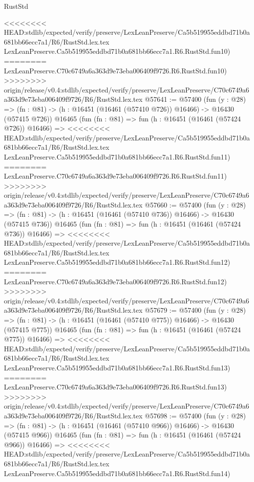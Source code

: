 \begin{lexlean}{RustStd}
\begin{coremodule}
{\begin{coremodule}
{{{{{{{{{{{{{{{{{{{{{{{{{{{{{{{{{{{{{{{{{{{{{{{{{{{{{{{<<<<<<<< HEAD:stdlib/expected/verify/preserve/LexLeanPreserve/Ca5b519955eddbd71b0a681bb66ecc7a1/R6/RustStd.lex.tex
    LexLeanPreserve.Ca5b519955eddbd71b0a681bb66ecc7a1.R6.RustStd.fun10)
========
    LexLeanPreserve.C70c6749a6a363d9e73eba006409f9726.R6.RustStd.fun10)
>>>>>>>> origin/release/v0.4:stdlib/expected/verify/preserve/LexLeanPreserve/C70c6749a6a363d9e73eba006409f9726/R6/RustStd.lex.tex
@57641 := @57400
    (fun (y : @28) =>
    (fn : @81) -> (h : @16451 (@16461 (@57410 @726)) @16466) -> @16430 (@57415 @726))
    @16465
    (fun (fn : @81) =>
    fun (h : @16451 (@16461 (@57424 @726)) @16466) =>
<<<<<<<< HEAD:stdlib/expected/verify/preserve/LexLeanPreserve/Ca5b519955eddbd71b0a681bb66ecc7a1/R6/RustStd.lex.tex
    LexLeanPreserve.Ca5b519955eddbd71b0a681bb66ecc7a1.R6.RustStd.fun11)
========
    LexLeanPreserve.C70c6749a6a363d9e73eba006409f9726.R6.RustStd.fun11)
>>>>>>>> origin/release/v0.4:stdlib/expected/verify/preserve/LexLeanPreserve/C70c6749a6a363d9e73eba006409f9726/R6/RustStd.lex.tex
@57660 := @57400
    (fun (y : @28) =>
    (fn : @81) -> (h : @16451 (@16461 (@57410 @736)) @16466) -> @16430 (@57415 @736))
    @16465
    (fun (fn : @81) =>
    fun (h : @16451 (@16461 (@57424 @736)) @16466) =>
<<<<<<<< HEAD:stdlib/expected/verify/preserve/LexLeanPreserve/Ca5b519955eddbd71b0a681bb66ecc7a1/R6/RustStd.lex.tex
    LexLeanPreserve.Ca5b519955eddbd71b0a681bb66ecc7a1.R6.RustStd.fun12)
========
    LexLeanPreserve.C70c6749a6a363d9e73eba006409f9726.R6.RustStd.fun12)
>>>>>>>> origin/release/v0.4:stdlib/expected/verify/preserve/LexLeanPreserve/C70c6749a6a363d9e73eba006409f9726/R6/RustStd.lex.tex
@57679 := @57400
    (fun (y : @28) =>
    (fn : @81) -> (h : @16451 (@16461 (@57410 @775)) @16466) -> @16430 (@57415 @775))
    @16465
    (fun (fn : @81) =>
    fun (h : @16451 (@16461 (@57424 @775)) @16466) =>
<<<<<<<< HEAD:stdlib/expected/verify/preserve/LexLeanPreserve/Ca5b519955eddbd71b0a681bb66ecc7a1/R6/RustStd.lex.tex
    LexLeanPreserve.Ca5b519955eddbd71b0a681bb66ecc7a1.R6.RustStd.fun13)
========
    LexLeanPreserve.C70c6749a6a363d9e73eba006409f9726.R6.RustStd.fun13)
>>>>>>>> origin/release/v0.4:stdlib/expected/verify/preserve/LexLeanPreserve/C70c6749a6a363d9e73eba006409f9726/R6/RustStd.lex.tex
@57698 := @57400
    (fun (y : @28) =>
    (fn : @81) -> (h : @16451 (@16461 (@57410 @966)) @16466) -> @16430 (@57415 @966))
    @16465
    (fun (fn : @81) =>
    fun (h : @16451 (@16461 (@57424 @966)) @16466) =>
<<<<<<<< HEAD:stdlib/expected/verify/preserve/LexLeanPreserve/Ca5b519955eddbd71b0a681bb66ecc7a1/R6/RustStd.lex.tex
    LexLeanPreserve.Ca5b519955eddbd71b0a681bb66ecc7a1.R6.RustStd.fun14)
}}}}}}}}}}}}}}}}}}}}}}}}}}}}}}}}}}}}}}}}}}}}}}}}}}}}}}}
\end{coremodule}}
\end{coremodule}
\end{lexlean}
